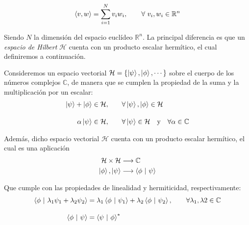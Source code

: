 \documentclass{article}
\numberwithin{equation}{section} %
\begin{document}
    \begin{equation*}
        \braket{v, w} = \sum_{i = 1}^{N} v_{i} w_{i}, \qquad \forall \ v_{i}, w_{i} \in \mathbb{R}^{n}
    \end{equation*}

    \vspace{2.5mm}

    Siendo \( N \) la dimensión del espacio euclídeo \( \mathbb{R}^{n} \). La principal diferencia es que un \textit{espacio de Hilbert} \( \mathcal{H} \) cuenta con un producto escalar hermítico, el cual definiremos a continuación.

    \vspace{5mm}

    Consideremos un espacio vectorial \( \mathcal{H} = \{ \ket{\psi}, \ket{\phi}, \cdots \} \) sobre el cuerpo de los números complejos \( \mathbb{C} \), de manera que se cumplen la propiedad de la suma y la multiplicación por un escalar:
    \begin{align*}
        \ket{\psi} + \ket{\phi} \in \mathcal{H}, \qquad &\forall \ket{\psi}, \ket{\phi} \in \mathcal{H}\\[10pt]
        \alpha \ket{\psi} \in \mathcal{H}, \qquad &\forall \ket{\psi} \in \mathcal{H} \quad \text{y} \quad \forall \alpha \in \mathbb{C}
    \end{align*}

    \vspace{1.5mm}

    Además, dicho espacio vectorial \( \mathcal{H} \) cuenta con un producto escalar hermítico, el cual es una aplicación
    \begin{align*}
        \mathcal{H} \times \mathcal{H} &\longrightarrow \mathbb{C} \\
        \ket{\phi}, \ket{\psi} &\longrightarrow \braket{\phi \ | \ \psi}
    \end{align*}

    \vspace{1.5mm}

    Que cumple con las propiedades de linealidad y hermiticidad, respectivamente:
    \begin{align*}
        \braket{\phi \ | \ \lambda_{1}\psi_{1} + \lambda_{2}\psi_{2}} &= \lambda_{1} \braket{\phi \ | \ \psi_{1}} + \lambda_{2} \braket{\phi \ | \ \psi_{2}}, \qquad \forall \lambda_{1}, \lambda{2} \in \mathbb{C} \\[10pt]
        \braket{\phi \ | \ \psi} &= \braket{\psi \ | \ \phi}^{*}
    \end{align*}
\end{document}
